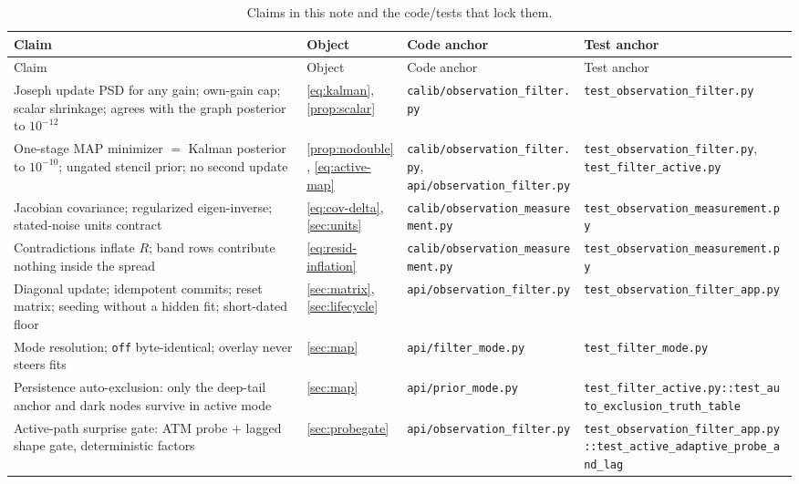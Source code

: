 \documentclass[11pt]{article}
\begin{document}
\begingroup
\small
\setlength{\tabcolsep}{3pt}
\begin{longtable}{@{}p{}p{}p{}p{}@{}}
\caption{Claims in this note and the code/tests that lock them.}\\
\toprule Claim & Object & Code anchor & Test anchor\\ \midrule
\endfirsthead
\toprule Claim & Object & Code anchor & Test anchor\\ \midrule
\endhead
Joseph update PSD for any gain; own-gain cap; scalar shrinkage; agrees
with the graph posterior to $10^{-12}$ &
\cref{eq:kalman}, \cref{prop:scalar} &
\nolinkurl{calib/observation_filter.py} &
\nolinkurl{test_observation_filter.py}\\
One-stage MAP minimizer $=$ Kalman posterior to $10^{-10}$; ungated
stencil prior; no second update &
\cref{prop:nodouble}, \cref{eq:active-map} &
\nolinkurl{calib/observation_filter.py},
\nolinkurl{api/observation_filter.py} &
\nolinkurl{test_observation_filter.py},
\nolinkurl{test_filter_active.py}\\
Jacobian covariance; regularized eigen-inverse; stated-noise units
contract &
\cref{eq:cov-delta}, \cref{sec:units} &
\nolinkurl{calib/observation_measurement.py} &
\nolinkurl{test_observation_measurement.py}\\
Contradictions inflate $R$; band rows contribute nothing inside the
spread &
\cref{eq:resid-inflation} &
\nolinkurl{calib/observation_measurement.py} &
\nolinkurl{test_observation_measurement.py}\\
Diagonal update; idempotent commits; reset matrix; seeding without a
hidden fit; short-dated floor &
\cref{sec:matrix}, \cref{sec:lifecycle} &
\nolinkurl{api/observation_filter.py} &
\nolinkurl{test_observation_filter_app.py}\\
Mode resolution; \texttt{off} byte-identical; overlay never steers
fits &
\cref{sec:map} &
\nolinkurl{api/filter_mode.py} &
\nolinkurl{test_filter_mode.py}\\
Persistence auto-exclusion: only the deep-tail anchor and dark nodes
survive in active mode &
\cref{sec:map} &
\nolinkurl{api/prior_mode.py} &
\nolinkurl{test_filter_active.py::test_auto_exclusion_truth_table}\\
Active-path surprise gate: ATM probe + lagged shape gate, deterministic
factors &
\cref{sec:probegate} &
\nolinkurl{api/observation_filter.py} &
\nolinkurl{test_observation_filter_app.py::test_active_adaptive_probe_and_lag}\\

\end{longtable}
\end{document}
